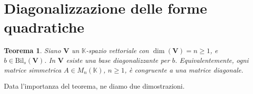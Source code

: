 \documentclass{article}
\theoremstyle{plain}
\newtheorem{thm}{Teorema}[section]
\theoremstyle{definition}
\theoremstyle{remark}
\begin{document}
\newpage
\section{Diagonalizzazione delle forme quadratiche}
\vspace{20pt}

\begin{bxthm}
\begin{thm}\label{sediciunoo}
Siano $\mathbf{V}$ un $\mathbb{K}$-spazio vettoriale con $\dim(\mathbf{V}) = n \geq 1$, e $b\in\mathrm{Bil}_s(\mathbf{V})$. 
In $\mathbf{V}$ esiste una base diagonalizzante per $b$. Equivalentemente, ogni matrice simmetrica 
$A \in M_n(\mathbb{K})$, $n \geq 1$, è congruente a una matrice diagonale.
\end{thm}
\end{bxthm}

\vspace{10pt}

Data l'importanza del teorema, ne diamo due dimostrazioni.

\vspace{10pt}
\end{document}
